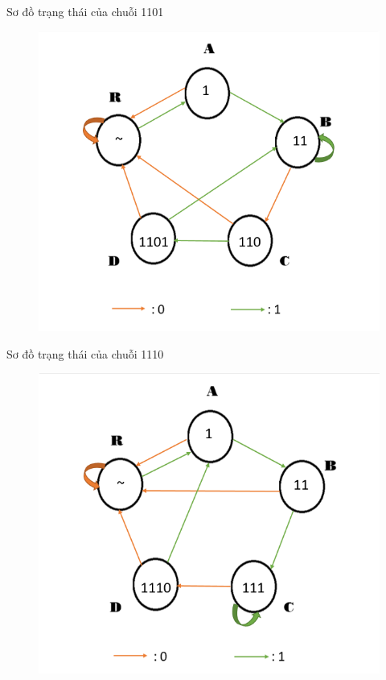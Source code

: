 \documentclass[a4paper]{article}
\begin{document}
		Sơ đồ trạng thái của chuỗi 1101
	\begin{center}
	\begin{figure}[h]
		\begin{center}
			\includegraphics[scale=0.53]{1101.png}
		\end{center}
	\end{figure}
	\end{center}
	\newpage
	Sơ đồ trạng thái của chuỗi 1110
	\begin{center}
	\begin{figure}[h]
		\begin{center}
			\includegraphics[scale=0.53]{1110.png}
		\end{center}
	\end{figure}
	\end{center}
	
\end{document}
